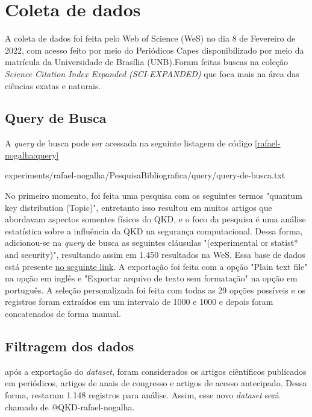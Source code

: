 \section{Coleta de dados}

A coleta de dados foi feita pelo Web of Science (WeS) no dia 8 de Fevereiro de 2022, com acesso feito por meio do Periódicos Capes disponibilizado por meio da matrícula da Universidade de Brasília (UNB).Foram feitas buscas na coleção \textit{Science Citation Index Expanded (SCI-EXPANDED)} que foca mais na área das ciências exatas e naturais. 

\subsection{Query de Busca}

A \textit{query} de busca pode ser acessada na seguinte listagem de código \ref{rafael-nogalha:query}


{experiments/rafael-nogalha/PesquisaBibliografica/query/query-de-busca.txt}

No primeiro momento, foi feita uma pesquisa com os seguintes termos "quantum key distribution (Topic)", entretanto isso resultou em muitos artigos que abordavam aspectos somentes físicos do QKD, e o foco da pesquisa é uma análise estatística sobre a influência da QKD na segurança computacional. Dessa forma, adicionou-se na \textit{query} de busca as seguintes cláusulas "(experimental  or statist* and security)", resultando assim em 1.450 resultados na WeS. Essa base de dados está presente \href{https://github.com/jhcf/Comput-Experim-20212/tree/main/experiments/rafael-nogalha/PesquisaBibliografica/QKDSegurancaComputacional/dataset/dataset.txt}{no seguinte link}. A exportação foi feita com a opção "Plain text file" na opção em inglês e "Exportar arquivo de texto sem formatação" na opção em português. A seleção personalizada foi feita com todas as 29 opções possíveis e os registros foram extraídos em um intervalo de 1000 e 1000 e depois foram concatenados de forma manual.

\subsection{Filtragem dos dados}

após a exportação do \textit{dataset}, foram considerados os artigos ciêntíficos publicados em periódicos, artigos de anais de congresso e artigos de acesso antecipado. Dessa forma, restaram 1.148   registros para análise. Assim, esse novo \textit{dataset} será chamado de @QKD-rafael-nogalha.

